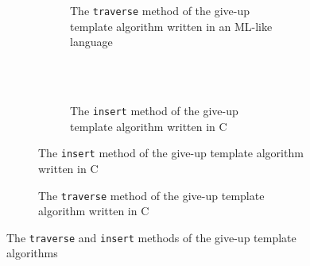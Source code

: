 \documentclass[a4paper,UKenglish,cleveref, autoref, thm-restate]{lipics-v2021}
\begin{document}
%		 
%		 

\begin{figure}[h]
	\begin{subfigure}[t]{0.48\textwidth}
		\begin{subfigure}[t]{\textwidth}
			 
			\caption{The \lstinline{traverse} method of the give-up template algorithm written in an ML-like language}
			\label{traverse_giveup_a}	
		\end{subfigure}
		\\ \\ 
		\renewcommand{\thesubfigure}{c}%
		\begin{subfigure}[t]{\textwidth}
			 
			\caption{The \lstinline{insert} method of the give-up template algorithm written in C}
			\label{insert_giveup}	
		\end{subfigure}
	\end{subfigure}\qquad
	\renewcommand{\thesubfigure}{b}%
	\begin{subfigure}[t]{0.48\textwidth}
		 
		\caption{The \lstinline{traverse} method of the give-up template algorithm written in C}
		\label{traverse_giveup_b}
	\end{subfigure}
	\caption{The \lstinline{traverse} and \lstinline{insert} methods of the give-up template algorithms}
	\label{traverse_giveup}
\end{figure}
\end{document}

